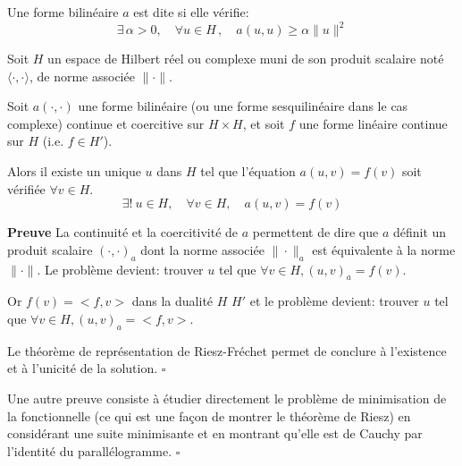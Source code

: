 \medskip
\begin{definition}
Une forme bilinéaire $a$ est dite  si elle vérifie:
\begin{equation}
\exists\,\alpha>0,\quad \forall u\in H\,,\quad a(u,u) \geq \alpha\|u\|^2
\end{equation}
\end{definition}

\begin{theoreme}
Soit $H$ un espace de Hilbert réel ou complexe muni de son produit scalaire noté
$\langle\cdot,\cdot\rangle$, de norme associée $\|\cdot\|$.

Soit $a(\cdot,\cdot)$ une forme bilinéaire (ou une forme sesquilinéaire dans le cas complexe)
continue et coercitive sur $H\times H$, et soit $f$ une forme linéaire continue sur $H$ (i.e.
$f\in H'$).

Alors il existe un unique $u$ dans $H$ tel que l'équation $a(u,v) = f(v)$ soit
vérifiée $\forall v \in H$.
\begin{equation}
   \exists!\ u \in H,\quad \forall v\in H,\quad a(u,v)=f(v)
\end{equation}
\end{theoreme}


\medskip
{\noindent\footnotesize{}
\textbf{Preuve}\hskip5pt
La continuité et la coercitivité de $a$ permettent de dire que $a$ définit
un produit scalaire $(\cdot,\cdot)_a$ dont la norme associée $\|\cdot\|_a$ est
équivalente à la norme $\|\cdot\|$.
Le problème devient: trouver $u$ tel que $\forall v\in H, (u,v)_a=f(v)$.

Or  $f(v)=<f,v>$ dans la dualité $H$ $H'$ et le problème devient:
trouver $u$ tel que $\forall v\in H, (u,v)_a=<f,v>$.

Le théorème de représentation de Riesz-Fréchet permet de conclure à l'existence
et à l'unicité de la solution. $\square$

\noindent
Une autre preuve consiste à  étudier directement le problème de minimisation de la
fonctionnelle  (ce qui est une façon de montrer le théorème de Riesz)
en considérant une suite minimisante et en montrant qu'elle est de Cauchy
par l'identité du parallélogramme. $\square$
}


